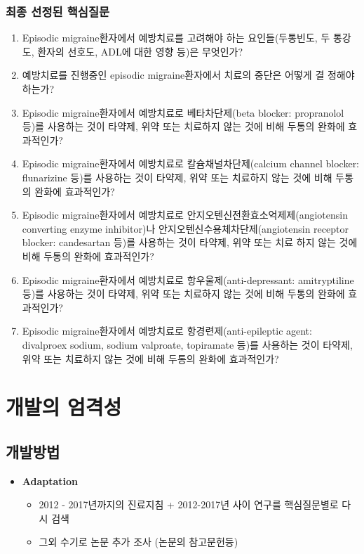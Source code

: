 \documentclass[]{book}
\providecommand{\tightlist}{%
  \setlength{\itemsep}{0pt}\setlength{\parskip}{0pt}}
\begin{document}
\hypertarget{section-51}{%
\subsection{최종 선정된 핵심질문}\label{section-51}}

\begin{enumerate}
\def\labelenumi{\arabic{enumi}.}
\item
  Episodic migraine환자에서 예방치료를 고려해야 하는 요인들(두통빈도, 두 통강도, 환자의 선호도, ADL에 대한 영향 등)은 무엇인가?
\item
  예방치료를 진행중인 episodic migraine환자에서 치료의 중단은 어떻게 결 정해야 하는가?
\item
  Episodic migraine환자에서 예방치료로 베타차단제(beta blocker: propranolol 등)를 사용하는 것이 타약제, 위약 또는 치료하지 않는 것에 비해 두통의 완화에 효과적인가?
\item
  Episodic migraine환자에서 예방치료로 칼슘채널차단제(calcium channel blocker: flunarizine 등)를 사용하는 것이 타약제, 위약 또는 치료하지 않는 것에 비해 두통의 완화에 효과적인가?
\item
  Episodic migraine환자에서 예방치료로 안지오텐신전환효소억제제(angiotensin converting enzyme inhibitor)나 안지오텐신수용체차단제(angiotensin receptor blocker: candesartan 등)를 사용하는 것이 타약제, 위약 또는 치료 하지 않는 것에 비해 두통의 완화에 효과적인가?
\item
  Episodic migraine환자에서 예방치료로 항우울제(anti-depressant: amitryptiline 등)를 사용하는 것이 타약제, 위약 또는 치료하지 않는 것에 비해 두통의 완화에 효과적인가?
\item
  Episodic migraine환자에서 예방치료로 항경련제(anti-epileptic agent: divalproex sodium, sodium valproate, topiramate 등)를 사용하는 것이 타약제, 위약 또는 치료하지 않는 것에 비해 두통의 완화에 효과적인가?
\end{enumerate}

\hypertarget{section-52}{%
\chapter{개발의 엄격성}\label{section-52}}

\hypertarget{section-53}{%
\section{개발방법}\label{section-53}}

\begin{itemize}
\tightlist
\item
  \textbf{Adaptation}

  \begin{itemize}
  \tightlist
  \item
    2012 - 2017년까지의 진료지침 + 2012-2017년 사이 연구를 핵심질문별로 다시 검색
  \item
    그외 수기로 논문 추가 조사 (논문의 참고문헌등)
  \end{itemize}
\end{itemize}
\end{document}
